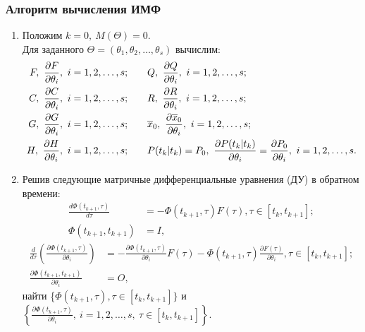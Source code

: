 \documentclass[a4paper,14pt]{extarticle}
\newcommand{\pd}[2]{\frac{\partial #1}{\partial #2}}
\begin{document}
\subsubsection{Алгоритм вычисления ИМФ}
\begin{enumerate}
	\item Положим $k = 0,\ M(\Theta) = 0$. \\
		Для заданного $\Theta = (\theta_1, \theta_2, \ldots, \theta_s)$ вычислим:
\begin{align*}
	F,\ \pd{F}{\theta_i},\ i=1,2,\ldots,s; \qquad &
	Q,\ \pd{Q}{\theta_i},\ i=1,2,\ldots,s; \\
	C,\ \pd{C}{\theta_i},\ i=1,2,\ldots,s; \qquad &
	R,\ \pd{R}{\theta_i},\ i=1,2,\ldots,s; \\
	G,\ \pd{G}{\theta_i},\ i=1,2,\ldots,s; \qquad &
	\ol{x}_0,\ \pd{\ol{x}_0}{\theta_i},\ i=1,2,\ldots,s; \\
	H,\ \pd{H}{\theta_i},\ i=1,2,\ldots,s; \qquad &
	P(t_k|t_k) = P_0,\ 
		\pd{P(t_k|t_k)}{\theta_i} = \pd{P_0}{\theta_i},\ i=1,2,\ldots,s.
\end{align*}

\newpage

\newcommand{\deriv}[2]{\frac{d #1}{d #2}}

\item Решив следующие матричные дифференциальные уравнения (ДУ) в обратном
	времени:
	\begin{align*}
		\deriv{\Phi(t_{k+1}, \tau)}{\tau} &= - \Phi(t_{k+1}, \tau) F(\tau), \tau \in
			[t_k, t_{k+1}]; \\
		\Phi(t_{k+1}, t_{k+1}) &= I, 
	\end{align*}
	\begin{align*}
		\deriv{}{\tau} \left( \pd{\Phi(t_{k+1}, \tau)}{\theta_i} \right) &=
			- \pd{\Phi(t_{k+1}, \tau)}{\theta_i} F(\tau) - \Phi(t_{k+1}, \tau)
			\pd{F(\tau)}{\theta_i}, \tau \in [t_k, t_{k+1}]; \\
		\pd{\Phi(t_{k+1}, t_{k+1})}{\theta_i} &= O,
	\end{align*}
	найти \{$\Phi(t_{k+1}, \tau), \tau \in [t_k, t_{k+1}]\}$ и 
		$\left\{ \pd{\Phi(t_{k+1}, \tau)}{\theta_i},\ i=1,2,\ldots,s,\ \tau \in
		[t_k, t_{k+1}] \right\}$.


\end{enumerate}
\end{document}
